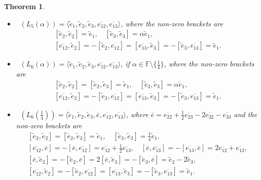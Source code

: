 \documentclass[11pt,a4paper]{amsart}
\theoremstyle{plain}
\newtheorem{theorem}[subsection]{Theorem}
\theoremstyle{definition}
\theoremstyle{remark}
\numberwithin{equation}{section}
\newcommand{\0}{\emptyset}
\newcommand{\bF}{\mathbb{F}}
\DeclareMathOperator{\holL}{hol_{Lie}}
\newcommand{\ov}[1]{\overline{#1}}
\begin{document}
\begin{theorem}
\begin{itemize}[itemsep=0.35em]
		\item  $\holL(L_5(\alpha))=\langle \widetilde{e}_1,\widetilde{e}_2,\widetilde{e}_3,\ov{e_{12}},\ov{e_{13}} \rangle$, where the non-zero brackets are
		      \begin{gather*}
		      	\left[\widetilde{e}_2,\widetilde{e}_2\right]=\widetilde{e}_1, \quad \left[\widetilde{e}_3,\widetilde{e}_3\right] = \alpha \widetilde{e}_1,\\
		      	\left[\ov{e_{12}},\widetilde{e}_2\right] = -\left[\widetilde{e}_2,\ov{e_{12}}\right] = 
		      	\left[\ov{e_{13}},\widetilde{e}_3\right] = -\left[\widetilde{e}_3,\ov{e_{13}}\right] = \widetilde{e}_1.
		      \end{gather*}
		      
		\item  $\holL(L_6(\alpha))=\langle \widetilde{e}_1,\widetilde{e}_2,\widetilde{e}_3,\ov{e_{12}},\ov{e_{13}} \rangle$, if $\alpha \in \bF \setminus \lbrace \frac{1}{4} \rbrace$, where the non-zero brackets are
		      \begin{gather*}
		      	\left[\widetilde{e}_2,\widetilde{e}_2\right]=\left[\widetilde{e}_2,\widetilde{e}_3\right]=\widetilde{e}_1, \quad \left[\widetilde{e}_3,\widetilde{e}_3\right] = \alpha \widetilde{e}_1,\\
		      	\left[\ov{e_{12}},\widetilde{e}_2\right] = -\left[\widetilde{e}_2,\ov{e_{12}}\right] = 
		      	\left[\ov{e_{13}},\widetilde{e}_3\right] = -\left[\widetilde{e}_3,\ov{e_{13}}\right] = \widetilde{e}_1.
		      \end{gather*}
		      
		\item  $\holL(L_6\left(\tfrac{1}{4}\right))=\langle \widetilde{e}_1,\widetilde{e}_2,\widetilde{e}_3,\ov{e},\ov{e_{12}},\ov{e_{13}} \rangle$, where $\ov{e}=\ov{e_{22}}+\frac{1}{2}\ov{e_{23}}-2\ov{e_{32}}-\ov{e_{33}}$ and the non-zero brackets are
		      \begin{gather*}
\left[\widetilde{e}_2,\widetilde{e}_2\right]=\left[\widetilde{e}_2,\widetilde{e}_3\right]=\widetilde{e}_1, \quad \left[\widetilde{e}_3,\widetilde{e}_3\right] = \tfrac{1}{4} \widetilde{e}_1,\\ \left[\ov{e_{12}},\ov{e}\right]=-\left[\ov{e},\ov{e_{12}}\right]=\ov{e_{12}}+\frac{1}{2}\ov{e_{13}}, \quad \left[\ov{e},\ov{e_{13}}\right]=-\left[\ov{e_{13}},\ov{e}\right]=2\ov{e_{12}}+\ov{e_{13}},\\
		      	\left[\ov{e},\widetilde{e}_2\right]=-\left[\widetilde{e}_2,\ov{e}\right]=2\left[\ov{e},\widetilde{e}_3\right]=-\left[\widetilde{e}_3,\ov{e}\right]=\widetilde{e}_2-2\widetilde{e}_3,\\
		      	\left[\ov{e_{12}},\widetilde{e}_2\right] = -\left[\widetilde{e}_2,\ov{e_{12}}\right] = 
		      	\left[\ov{e_{13}},\widetilde{e}_3\right] = -\left[\widetilde{e}_3,\ov{e_{13}}\right] = \widetilde{e}_1.
		      \end{gather*}
		      

\end{itemize}
\end{theorem}
\end{document}
